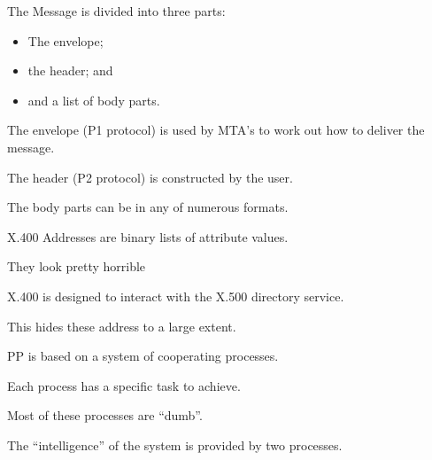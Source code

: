\begin{bwslide}
\begin{nrtc}
\item	The Message is divided into three parts:
	\begin{itemize}
	\item	The envelope;
	\item	the header; and
	\item	and a list of body parts.
	\end{itemize}

\item	The envelope (P1 protocol) is used by MTA's to work out how to
	deliver the message.

\item	The header (P2 protocol) is constructed by the user.

\item	The body parts can be in any of numerous formats.

\end{nrtc}
\end{bwslide}

\begin{bwslide}
\begin{nrtc}
\item	X.400 Addresses are binary lists of attribute values.

\item	They look pretty horrible

\item	X.400 is designed to interact with the X.500 directory service.

\item	This hides these address to a large extent.
\end{nrtc}
\end{bwslide}

\begin{bwslide}
\begin{nrtc}
\item	PP is based on a system of cooperating processes.

\item	Each process has a specific task to achieve.

\item	Most of these processes are ``dumb''.

\item	The ``intelligence'' of the system is provided by two processes.

\end{nrtc}
\end{bwslide}

